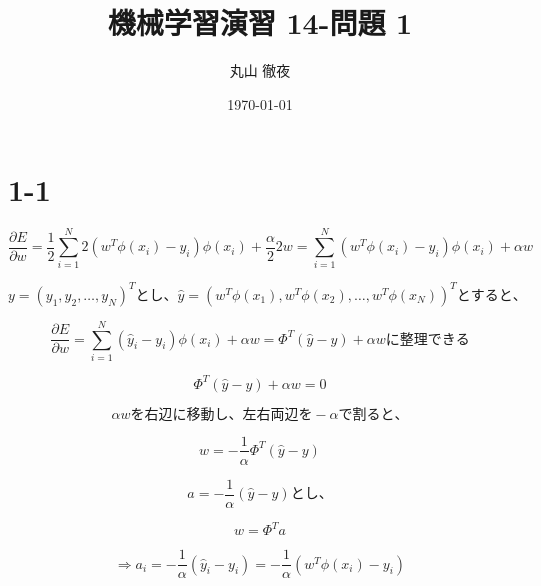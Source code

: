 \documentclass[a4paper,11pt]{jsarticle}
\begin{document}
\title{機械学習演習 14-問題 1}
\author{丸山 徹夜}
\date{\today}
\maketitle

\section*{1-1}

\begin{equation*}
  \frac{\partial{E}}{\partial{w}}
    = \frac{1}{2} \sum_{i=1}^{N} 2(w^T \phi(x_i) - y_i) \phi(x_i) + \frac{\alpha}{2}2w
    = \sum_{i=1}^{N} (w^T \phi(x_i) - y_i) \phi(x_i) + \alpha w
\end{equation*}

\begin{equation*}
  y = (y_1, y_2, \ldots, y_N)^Tとし、　
  \hat{y} = (w^T \phi(x_1), w^T \phi(x_2), \ldots, w^T \phi(x_N))^Tとすると、
\end{equation*}

\begin{equation*}
  \frac{\partial{E}}{\partial{w}} = \sum_{i=1}^{N} (\hat{y}_i - y_i) \phi(x_i) + \alpha w = \Phi^T (\hat{y} - y) + \alpha wに整理できる
\end{equation*}

\begin{equation*}
  \Phi^T (\hat{y} - y) + \alpha w = 0
\end{equation*}

\begin{equation*}
  \alpha wを右辺に移動し、左右両辺を -\alpha で割ると、
\end{equation*}

\begin{equation*}
  w = - \frac{1}{\alpha} \Phi^T (\hat{y} - y)
\end{equation*}

\begin{equation*}
  a = - \frac{1}{\alpha} (\hat{y} - y) とし、
\end{equation*}

\begin{equation*}
  w = \Phi^T a
\end{equation*}

\begin{equation*}
  \Rightarrow a_i = - \frac{1}{\alpha} (\hat{y}_i - y_i)
      = - \frac{1}{\alpha} (w^T \phi(x_i) - y_i)
\end{equation*}
\end{document}

